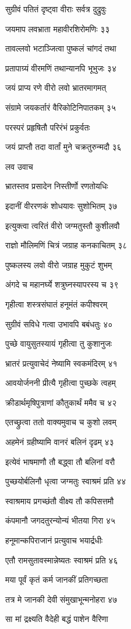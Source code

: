 सुग्रीवं पतितं दृष्ट्वा वीराः सर्वत्र दुद्रुवुः

जयमाप लवभ्राता महावीरशिरोमणिः ३३

तावल्लवो भटाञ्जित्वा पुष्कलं चांगदं तथा

प्रतापाग्र्यं वीरमणिं तथान्यानपि भूभुजः ३४

जयं प्राप्य रणे वीरो लवो भ्रातरमागमत्

संग्रामे जयकर्तारं वैरिकोटिनिपातकम् ३५

परस्परं प्रहृषितौ परिरंभं प्रकुर्वतः

जयं प्राप्तौ तदा वार्तां मुने चक्रतुरुन्मदौ ३६

लव उवाच

भ्रातस्तव प्रसादेन निस्तीर्णो रणतोयधिः

इदानीं वीररणकं शोधयावः सुशोभितम् ३७

इत्युक्त्वा त्वरितं वीरो जग्मतुस्तौ कुशीलवौ

राज्ञो मौलिमणिं चित्रं जग्राह कनकाचितम् ३८

पुष्कलस्य लवो वीरो जग्राह मुकुटं शुभम्

अंगदे च महानर्घ्ये शत्रुघ्नस्यापरस्य च ३९

गृहीत्वा शस्त्रसंघातं हनूमंतं कपीश्वरम्

सुग्रीवं सविधे गत्वा उभावपि बबंधतुः ४०

पुच्छे वायुसुतस्यायं गृहीत्वा तु कुशानुजः

भ्रातरं प्रत्युवाचेदं नेष्यामि स्वकमंदिरम् ४१

आवयोर्जननी प्रीत्यै गृहीत्वा पुच्छके त्वहम्

क्रीडार्थमृषिपुत्राणां कौतुकार्थं ममैव च ४२

एतच्छ्रुत्वा ततो वाक्यमुवाच च कुशो लवम्

अहमेनं ग्रहीष्यामि वानरं बलिनं दृढम् ४३

इत्येवं भाषमाणौ तौ बद्ध्वा तौ बलिनां वरौ

पुच्छयोर्बलिनौ धृत्वा जग्मतुः स्वाश्रमं प्रति ४४

स्वाश्रमाय प्रगच्छंतौ वीक्ष्य तौ कपिसत्तमौ

कंपमानौ जगदतुरन्योन्यं भीतया गिरा ४५

हनूमान्कपिराजानं प्रत्युवाच भयार्द्रधीः

एतौ रामसुतावस्मान्नेष्यतः स्वाश्रमं प्रति ४६

मया पूर्वं कृतं कर्म जानकीं प्रतिगच्छता

तत्र मे जानकी देवी संमुखाभून्मनोहरा ४७

सा मां द्रक्ष्यति वैदेही बद्धं पाशेन वैरिणा

